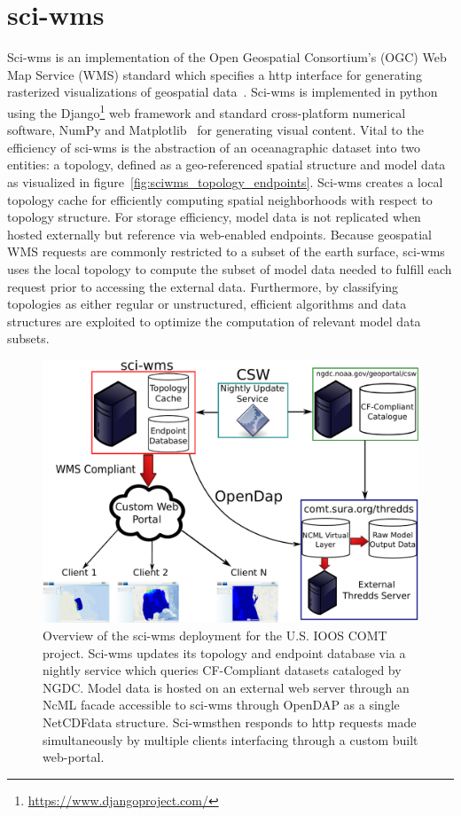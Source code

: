\documentclass[11pt,twocolumn,twoside]{IEEEtran}
\newcommand{\comt}{COMT}
\newcommand{\ioos}{IOOS}
\newcommand{\ogc}{OGC}
\newcommand{\wms}{WMS}
\newcommand{\ncml}{NcML}
\newcommand{\ngdc}{NGDC}
\newcommand{\opendap}{OpenDAP}
\newcommand{\netcdf}{NetCDF}
\newcommand{\sciwms}{sci-wms}
\newcommand{\Sciwms}{Sci-wms}
\begin{document}
\section{\sciwms{}}
\Sciwms{} is an implementation of the Open Geospatial Consortium's
(\ogc{}) Web Map Service (\wms{}) standard which specifies a http
interface for generating rasterized visualizations of geospatial
data~\cite{wms14}. Sci-wms is implemented in python using the
Django\footnote{\url{https://www.djangoproject.com/}} web framework
and standard cross-platform numerical software, NumPy and
Matplotlib~\cite{numpy11, hunter07} for generating visual
content. Vital to the efficiency of \sciwms{} is the
abstraction of an oceanagraphic dataset into two entities: a topology,
defined as a geo-referenced spatial structure and model data as
visualized in figure~\ref{fig:sciwms_topology_endpoints}. \Sciwms{}
creates a local topology cache for efficiently computing spatial
neighborhoods with respect to topology structure.  For storage
efficiency, model data is not replicated when hosted externally but
reference via web-enabled endpoints. Because
geospatial \wms{} requests are commonly restricted to a subset of the
earth surface, \sciwms{} uses the local topology to compute the
subset of model data needed to fulfill each request prior to
accessing the external data. Furthermore, by classifying
topologies as either regular or unstructured, efficient algorithms and
data structures are exploited to optimize the computation of relevant
model data subsets.

\begin{figure}
  \centering
  \includegraphics[width=\columnwidth]{./figs/overview.pdf}
  \caption{Overview of the \sciwms{} deployment for the U.S. \ioos{}
    \comt{} project. \Sciwms{} updates its topology and endpoint
    database via a nightly service which queries CF-Compliant datasets
    cataloged by \ngdc{}. Model data is hosted on an external web
    server through an \ncml{} facade accessible to \sciwms{} through
    \opendap{} as a single \netcdf data structure. \Sciwms then
    responds to http requests made simultaneously by multiple clients
    interfacing through a custom built web-portal.}
  \label{fig:overview1}
\end{figure}
\end{document}
